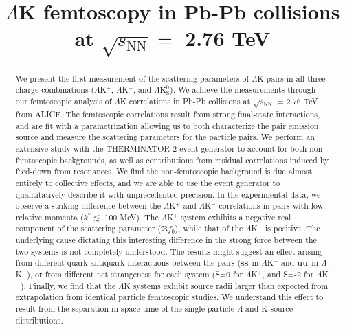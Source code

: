 \documentclass[ALICE,manyauthors]{cernphprep}
\newcommand{\Lam}{$\Lambda$\xspace}
\newcommand{\LamK}{$\Lambda$K\xspace}
\begin{document}
%

\begin{titlepage}
%
%

\title{\LamK femtoscopy in Pb-Pb collisions at $\sqrt{s_{\mathrm{NN}}} = $ 2.76 TeV}
\ShortTitle{\LamK femtoscopy in Pb-Pb collisions}   %


\begin{abstract}
We present the first measurement of the scattering parameters of $\Lambda$K pairs in all three charge combinations ($\Lambda$K$^{+}$, $\Lambda$K$^{-}$, and $\Lambda\mathrm{K^{0}_{S}}$).
We achieve the measurements through our femtoscopic analysis of $\Lambda$K correlations in Pb-Pb collisions at $\sqrt{s_{\mathrm{NN}}}$ = 2.76 TeV from ALICE.  
The femtoscopic correlations result from strong final-state interactions, and are fit with a parametrization allowing us to both characterize the pair emission source and measure the scattering parameters for the particle pairs.  
We perform an extensive study with the THERMINATOR 2 event generator to account for both non-femtoscopic backgrounds, as well as contributions from residual correlations induced by feed-down from resonances.
We find the non-femtoscopic background is due almost entirely to collective effects, and we are able to use the event generator to quantitatively describe it with unprecedented precision.
In the experimental data, we observe a striking difference between the $\Lambda$K$^{+}$ and $\Lambda$K$^{-}$ correlations in pairs with low relative momenta ($k^{*}\lesssim$ 100 MeV).
The $\Lambda$K$^{+}$ system exhibits a negative real component of the scattering parameter ($\Re f_{0}$), while that of the $\Lambda$K$^{-}$ is positive.
The underlying cause dictating this interesting difference in the strong force between the two systems is not completely understood.
The results might suggest an effect arising from different quark-antiquark interactions between the pairs ($\rm s\bar{s}$ in $\Lambda$K$^{+}$ and $\rm u\bar{u}$ in $\Lambda$K$^{-}$), or from different net strangeness for each system (S=0 for $\Lambda$K$^{+}$, and S=-2 for $\Lambda$K$^{-}$).
Finally, we find that the \LamK systems exhibit source radii larger than expected from extrapolation from identical particle femtoscopic studies.
We understand this effect to result from the separation in space-time of the single-particle \Lam and K source distributions.
\end{abstract}
\end{titlepage}
\setcounter{page}{2}
\end{document}
